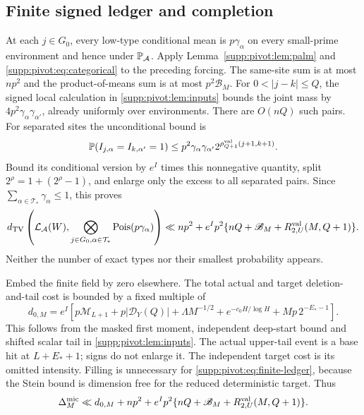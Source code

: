 \subsection{Finite signed ledger and completion}
At each $j\in G_0$, every low-type conditional mean is $p\gamma_\alpha$ on every small-prime environment and hence under $\mathbb P_{\mathcal A}$.
Apply Lemma~\ref{supp:pivot:lem:palm} and \eqref{supp:pivot:eq:categorical} to the preceding forcing.
The same-site sum is at most $np^2$ and the product-of-means sum is at most $p^2\mathscr B_M$.
For $0<|j-k|\le Q$, the signed local calculation in \cref{supp:pivot:lem:inputs} bounds the joint mass by $4p^2\gamma_\alpha\gamma_{\alpha'}$, already uniformly over environments. There are $O(nQ)$ such pairs.
For separated sites the unconditional bound is
\[
 \mathbb P(I_{j,\alpha}=I_{k,\alpha'}=1)
 \le p^2\gamma_\alpha\gamma_{\alpha'}
       2^{\rho^{\rm val}_{Q+1}(j+1,k+1)}.
\]
Bound its conditional version by $e^I$ times this nonnegative quantity, split $2^\rho=1+(2^\rho-1)$, and enlarge only the excess to all separated pairs. Since $\sum_{\alpha\in\mathcal T_*}\gamma_\alpha\le1$, this proves
\begin{equation}\label{supp:pivot:eq:finite-ledger}
 d_{\mathrm{TV}}\left(\mathcal L_{\mathcal A}(W),
             \bigotimes_{j\in G_0,\alpha\in\mathcal T_*}\operatorname{Pois}(p\gamma_\alpha)\right)
 \ll np^2+e^Ip^2\{nQ+\mathscr B_M+R^{\rm val}_{2,U}(M,Q+1)\}.
\end{equation}
Neither the number of exact types nor their smallest probability appears.

Embed the finite field by zero elsewhere. The total actual and target deletion-and-tail cost is bounded by a fixed multiple of
\begin{equation}\label{supp:pivot:eq:deletion}
 d_{0,M}=e^I\left[
 p\mathcal M_{L+1}+p|\mathcal D_Y(Q)|+\Lambda M^{-1/2}
 +e^{-c_0H/\log H}+Mp\,2^{-E_*-1}\right].
\end{equation}
This follows from the masked first moment, independent deep-start bound and shifted scalar tail in \cref{supp:pivot:lem:inputs}. The actual upper-tail event is a base hit at $L+E_*+1$; signs do not enlarge it. The independent target cost is its omitted intensity. Filling is unnecessary for \eqref{supp:pivot:eq:finite-ledger}, because the Stein bound is dimension free for the reduced deterministic target. Thus
\begin{equation}\label{supp:pivot:eq:complete-ledger}
 \Delta_M^{\rm mic}\ll d_{0,M}+np^2+
        e^Ip^2\{nQ+\mathscr B_M+R^{\rm val}_{2,U}(M,Q+1)\}.
\end{equation}

